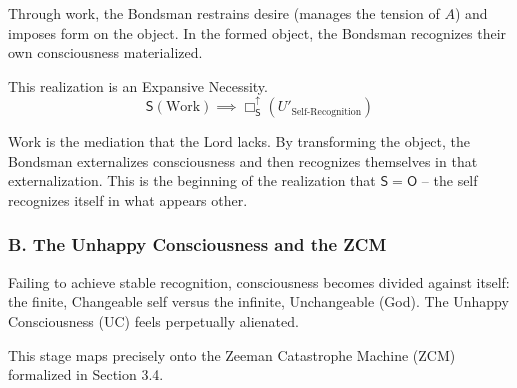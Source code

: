 \documentclass[12pt]{book}
\newcommand{\SBoxUp}{\Box_{\mathsf{S}}^{\uparrow}}
\begin{document}
\begin{itemize}
\begin{enumerate}
Through work, the Bondsman restrains desire (manages the tension of $A$) and imposes form on the object. In the formed object, the Bondsman recognizes their own consciousness materialized.

This realization is an Expansive Necessity.
\[
\mathsf{S}(\text{Work}) \implies \SBoxUp(U'_{\text{Self-Recognition}})
\]

Work is the mediation that the Lord lacks. By transforming the object, the Bondsman externalizes consciousness and then recognizes themselves in that externalization. This is the beginning of the realization that $\mathsf{S} = \mathsf{O}$ -- the self recognizes itself in what appears other.
\end{enumerate}
\end{itemize}

\subsubsection{B. The Unhappy Consciousness and the ZCM}

Failing to achieve stable recognition, consciousness becomes divided against itself: the finite, Changeable self versus the infinite, Unchangeable (God). The Unhappy Consciousness (UC) feels perpetually alienated.

This stage maps precisely onto the Zeeman Catastrophe Machine (ZCM) formalized in Section 3.4.
\end{document}
